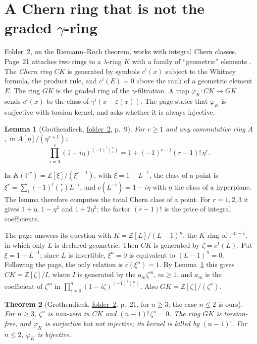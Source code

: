\documentclass[11pt,a4paper]{amsart}
\newtheorem{theorem}{Theorem}[section]
\newtheorem{lemma}[theorem]{Lemma}
\theoremstyle{definition}
\theoremstyle{remark}
\newcommand{\Z}{\mathbb Z}
\newcommand{\fac}[1]{\href{https://grothendieck.umontpellier.fr/#1.pdf}{folder~#1}}
\begin{document}
\section{A Chern ring that is not the graded \texorpdfstring{$\gamma$}{gamma}-ring}\label{sec:chern}

Folder~2, on the Riemann--Roch theorem, works with integral Chern classes. Page~21 attaches two rings to a $\lambda$-ring $K$ with a family of ``geometric'' elements \cite{fultonlang1985}. The \emph{Chern ring} $CK$ is generated by symbols $c^i(x)$ subject to the Whitney formula, the product rule, and $c^i(E) = 0$ above the rank of a geometric element $E$. The ring $GK$ is the graded ring of the $\gamma$-filtration. A map $\varphi_K\colon CK \to GK$ sends $c^i(x)$ to the class of $\gamma^i(x - \varepsilon(x))$. The page states that $\varphi_K$ is surjective with torsion kernel, and asks whether it is always injective.

\begin{lemma}[Grothendieck, \fac{2}, p.~9]\label{lem:point}
For $r \ge 1$ and any commutative ring $A$, in $A[\eta]/(\eta^{r+1})$:
\[
\prod_{i=0}^{r}(1 - i\eta)^{(-1)^i\binom ri} = 1 + (-1)^{r-1}(r-1)!\,\eta^r.
\]
\end{lemma}

In $K(\mathbb P^r) = \Z[\xi]/(\xi^{r+1})$, with $\xi = 1 - L^{-1}$, the class of a point is $\xi^r = \sum_i(-1)^i\binom ri L^{-i}$, and $c(L^{-i}) = 1 - i\eta$ with $\eta$ the class of a hyperplane. The lemma therefore computes the total Chern class of a point. For $r = 1, 2, 3$ it gives $1 + \eta$, $1 - \eta^2$ and $1 + 2\eta^3$; the factor $(r-1)!$ is the price of integral coefficients.

The page answers its question with $K = \Z[L]/(L - 1)^n$, the $K$-ring of $\mathbb P^{n-1}$, in which only $L$ is declared geometric. Then $CK$ is generated by $\zeta = c^1(L)$. Put $\xi = 1 - L^{-1}$; since $L$ is invertible, $\xi^n = 0$ is equivalent to $(L-1)^n = 0$. Following the page, the only relation is $c(\xi^n) = 1$. By Lemma~\ref{lem:point} this gives $CK = \Z[\zeta]/I$, where $I$ is generated by the $a_m\zeta^m$, $m \ge 1$, and $a_m$ is the coefficient of $\zeta^m$ in $\prod_{i=0}^n(1 - i\zeta)^{(-1)^i\binom ni}$. Also $GK = \Z[\zeta]/(\zeta^n)$.

\begin{theorem}[Grothendieck, \fac{2}, p.~21, for $n \ge 3$; the case $n \le 2$ is ours]\label{thm:chern}
For $n \ge 3$, $\zeta^n$ is non-zero in $CK$ and $(n-1)!\,\zeta^n = 0$. The ring $GK$ is torsion-free, and $\varphi_K$ is surjective but not injective; its kernel is killed by $(n-1)!$. For $n \le 2$, $\varphi_K$ is bijective.
\end{theorem}
\end{document}
